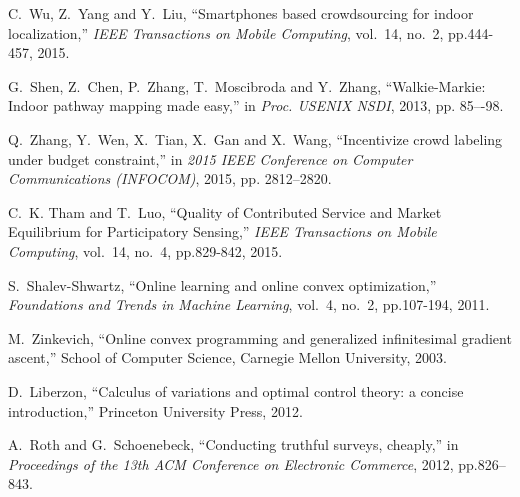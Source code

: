 \documentclass[10pt,conference,compsocconf,letterpaper]{IEEEtran}
\begin{document}
\begin{thebibliography}{99}
C.~Wu, Z.~Yang and Y.~Liu, ``Smartphones based crowdsourcing for indoor localization,'' \emph{IEEE Transactions on Mobile Computing}, vol.~14, no.~2, pp.444-457, 2015.

G.~Shen, Z.~Chen, P.~Zhang, T.~Moscibroda and Y.~Zhang, ``Walkie-Markie: Indoor pathway mapping made easy,'' in \emph{Proc. USENIX NSDI}, 2013, pp. 85–-98.

Q.~Zhang, Y.~Wen, X.~Tian, X.~Gan and X.~Wang, ``Incentivize crowd labeling under budget constraint,'' in \emph{2015 IEEE Conference on Computer Communications (INFOCOM)}, 2015, pp. 2812--2820.

C.~K. Tham and T.~Luo, ``Quality of Contributed Service and Market Equilibrium for Participatory Sensing,'' \emph{IEEE Transactions on Mobile Computing}, vol.~14, no.~4, pp.829-842, 2015.

S.~Shalev-Shwartz, ``Online learning and online convex optimization,'' \emph{Foundations and Trends in Machine Learning}, vol.~4, no.~2, pp.107-194, 2011.

M.~Zinkevich, ``Online convex programming and generalized infinitesimal gradient ascent,'' School of Computer Science, Carnegie Mellon University, 2003.

D.~Liberzon, ``Calculus of variations and optimal control theory: a concise introduction,'' Princeton University Press, 2012.

A.~Roth and G.~Schoenebeck, ``Conducting truthful surveys, cheaply,'' in \emph{Proceedings of the 13th ACM Conference on Electronic Commerce}, 2012, pp.826--843.

\end{thebibliography}
\end{document}
